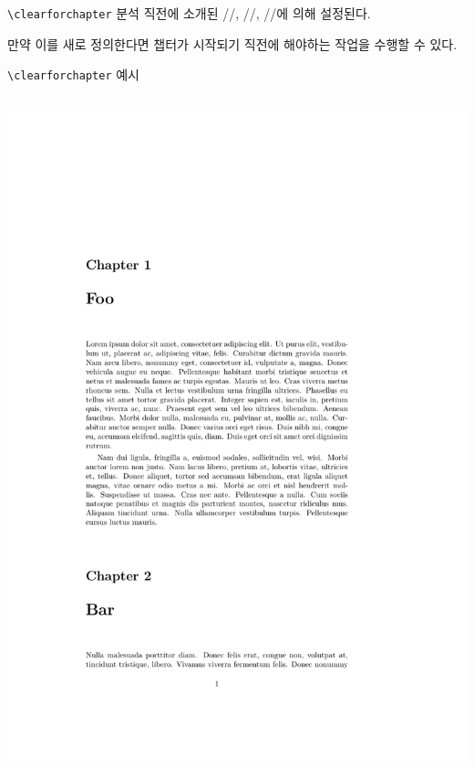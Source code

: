 \documentclass{beamer}
\def\tbs{\textbackslash}
\begin{document}
\begin{frame}[fragile]{\texttt{\tbs clearforchapter} 분석}
  직전에 소개된 \ltxverb/\openright/, \ltxverb/\openleft/, \ltxverb/\openany/에
  의해 설정된다.

  만약 이를 새로 정의한다면 챕터가 시작되기 직전에 해야하는 작업을 수행할 수
  있다.
\end{frame}

\begin{frame}[fragile]{\texttt{\tbs clearforchapter} 예시}
  \begin{latexcode}
    \renewcommand*{\clearforchapter}{}
  \end{latexcode}

  \begin{columns}
    \begin{column}{0.4\textwidth}
      \includegraphics[frame,page=1,width=\linewidth]{clearforchapter}
    \end{column}

\end{columns}
\end{frame}
\end{document}
